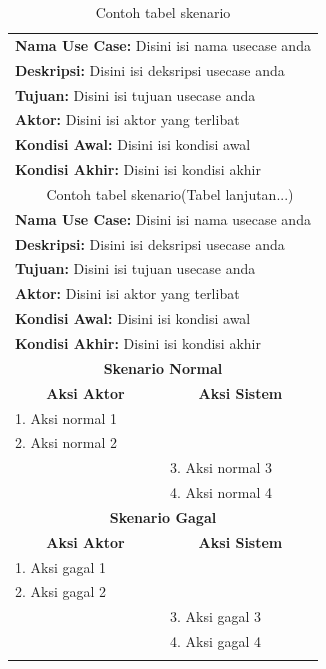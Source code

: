 \renewcommand\namaTabel{Contoh tabel skenario}
\begin{longtable}{p{6.5cm} p{6.5cm}}

	\caption{\namaTabel}\\
	\hline
	\multicolumn{2}{p{13cm}}{\textbf{Nama Use Case:} Disini isi nama usecase anda}\\
	\multicolumn{2}{p{13cm}}{\textbf{Deskripsi:} Disini isi deksripsi usecase anda}\\
	\multicolumn{2}{p{13cm}}{\textbf{Tujuan:} Disini isi tujuan usecase anda}\\
	\multicolumn{2}{p{13cm}}{\textbf{Aktor:} Disini isi aktor yang terlibat}\\
	\multicolumn{2}{p{13cm}}{\textbf{Kondisi Awal:} Disini isi kondisi awal}\\
	\multicolumn{2}{p{13cm}}{\textbf{Kondisi Akhir:} Disini isi kondisi akhir}\\
	\hline
	\endfirsthead

	\multicolumn{2}{c}{\tablename\ \thetable\ \namaTabel \space (Tabel lanjutan...)} \\
	\hline
	\multicolumn{2}{p{13cm}}{\textbf{Nama Use Case:} Disini isi nama usecase anda}\\
	\multicolumn{2}{p{13cm}}{\textbf{Deskripsi:} Disini isi deksripsi usecase anda}\\
	\multicolumn{2}{p{13cm}}{\textbf{Tujuan:} Disini isi tujuan usecase anda}\\
	\multicolumn{2}{p{13cm}}{\textbf{Aktor:} Disini isi aktor yang terlibat}\\
	\multicolumn{2}{p{13cm}}{\textbf{Kondisi Awal:} Disini isi kondisi awal}\\
	\multicolumn{2}{p{13cm}}{\textbf{Kondisi Akhir:} Disini isi kondisi akhir}\\
	\hline
	\endhead


	\multicolumn{2}{c}{\textbf{Skenario Normal}}\\ \hline
	\multicolumn{1}{c}{\textbf{Aksi Aktor}} & \multicolumn{1}{c}{\textbf{Aksi Sistem}}\\
	1. Aksi normal 1 & \\
	2. Aksi normal 2 &\\
	& 3. Aksi normal 3\\
	& 4. Aksi normal 4\\

	\hline
	\multicolumn{2}{c}{\textbf{Skenario Gagal}}\\ \hline
	\multicolumn{1}{c}{\textbf{Aksi Aktor}} & \multicolumn{1}{c}{\textbf{Aksi Sistem}}\\
	1. Aksi gagal 1 & \\
	2. Aksi gagal 2 &\\
	& 3. Aksi gagal 3\\
	& 4. Aksi gagal 4\\ \hline

\label{tabelD}
\end{longtable}

